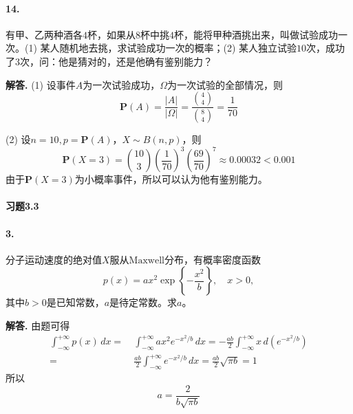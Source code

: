 \documentclass[12pt, a4paper, oneside]{ctexart}
\newenvironment{solution}{\par\noindent\textbf{解答. }}{\bigskip\par}
\begin{document}
\paragraph{14.}有甲、乙两种酒各$4$杯，如果从$8$杯中挑$4$杯，能将甲种酒挑出来，叫做试验成功一次。(1) 某人随机地去挑，求试验成功一次的概率；(2) 某人独立试验$10$次，成功了$3$次，问：他是猜对的，还是他确有鉴别能力？
\begin{solution}
    (1) 设事件$A$为一次试验成功，$\Omega$为一次试验的全部情况，则
    \begin{equation*}
        \mathbf{P}(A) = \frac{|A|}{|\Omega|} = \frac{\binom{4}{4}}{\binom{8}{4}} = \frac{1}{70}
    \end{equation*}

    (2) 设$n=10, p = \mathbf{P}(A)$，$X\sim B(n, p)$，则
    \begin{equation*}
        \mathbf{P}(X = 3) = \binom{10}{3}\left(\frac{1}{70}\right)^3\left(\frac{69}{70}\right)^7 \approx 0.00032 < 0.001
    \end{equation*}
    由于$\mathbf{P}(X=3)$为小概率事件，所以可以认为他有鉴别能力。
\end{solution}
\paragraph{习题3.3}
\paragraph{3.}分子运动速度的绝对值$X$服从$\text{Maxwell}$分布，有概率密度函数
\begin{equation*}
    p(x)=ax^2\exp\left\{-\frac{x^2}{b}\right\},\quad x > 0,
\end{equation*}
其中$b>0$是已知常数，$a$是待定常数。求$a$。
\def\P{\mathbf{P}} %
\begin{solution}
    由题可得
    \begin{equation*}
        \begin{aligned}
            \int_{-\infty}^{+\infty}p(x)\,dx =&\ \int_{-\infty}^{+\infty}ax^2e^{-x^2/b}\,dx=-\frac{ab}{2}\int_{-\infty}^{+\infty}x\,d(e^{-x^2/b})\\
            =&\ \frac{ab}{2}\int_{-\infty}^{+\infty}e^{-x^2/b}\,dx=\frac{ab}{2}\sqrt{\pi b} = 1
        \end{aligned}
    \end{equation*}
    所以
    \begin{equation*}
        a = \frac{2}{b\sqrt{\pi b}}
    \end{equation*}
\end{solution}
\end{document}
